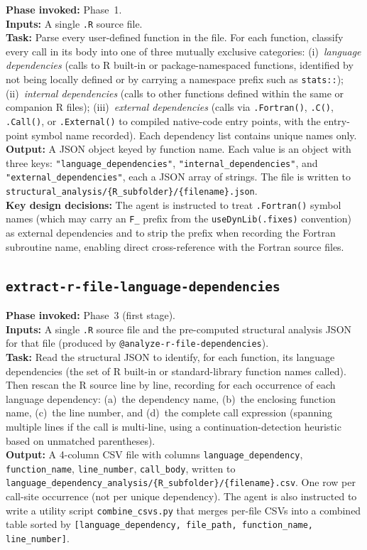 \documentclass[12pt,a4paper]{article}
\makeatletter
\newcommand{\agent}[1]{\texttt{@#1}}
\makeatother
\begin{document}
\textbf{Phase invoked:} Phase~1.\\
\textbf{Inputs:} A single \texttt{.R} source file.\\
\textbf{Task:} Parse every user-defined function in the file. For each function, classify every call in its body into one of three mutually exclusive categories: (i)~\textit{language dependencies} (calls to R built-in or package-namespaced functions, identified by not being locally defined or by carrying a namespace prefix such as \texttt{stats::}); (ii)~\textit{internal dependencies} (calls to other functions defined within the same or companion R files); (iii)~\textit{external dependencies} (calls via \texttt{.Fortran()}, \texttt{.C()}, \texttt{.Call()}, or \texttt{.External()} to compiled native-code entry points, with the entry-point symbol name recorded). Each dependency list contains unique names only.\\
\textbf{Output:} A JSON object keyed by function name. Each value is an object with three keys: \texttt{"language\_dependencies"}, \texttt{"internal\_dependencies"}, and \texttt{"external\_dependencies"}, each a JSON array of strings. The file is written to \texttt{structural\_analysis/\{R\_subfolder\}/\{filename\}.json}.\\
\textbf{Key design decisions:} The agent is instructed to treat \texttt{.Fortran()} symbol names (which may carry an \texttt{F\_} prefix from the \texttt{useDynLib(.fixes)} convention) as external dependencies and to strip the prefix when recording the Fortran subroutine name, enabling direct cross-reference with the Fortran source files.

\subsection{\texttt{extract-r-file-language-dependencies}}
\label{supp:agent-extract-lang}

\textbf{Phase invoked:} Phase~3 (first stage).\\
\textbf{Inputs:} A single \texttt{.R} source file and the pre-computed structural analysis JSON for that file (produced by \agent{analyze-r-file-dependencies}).\\
\textbf{Task:} Read the structural JSON to identify, for each function, its language dependencies (the set of R built-in or standard-library function names called). Then rescan the R source line by line, recording for each occurrence of each language dependency: (a)~the dependency name, (b)~the enclosing function name, (c)~the line number, and (d)~the complete call expression (spanning multiple lines if the call is multi-line, using a continuation-detection heuristic based on unmatched parentheses).\\
\textbf{Output:} A 4-column CSV file with columns \texttt{language\_dependency}, \texttt{function\_name}, \texttt{line\_number}, \texttt{call\_body}, written to \texttt{language\_dependency\_analysis/\{R\_subfolder\}/\{filename\}.csv}. One row per call-site occurrence (not per unique dependency). The agent is also instructed to write a utility script \texttt{combine\_csvs.py} that merges per-file CSVs into a combined table sorted by \texttt{[language\_dependency, file\_path, function\_name, line\_number]}.
\end{document}
